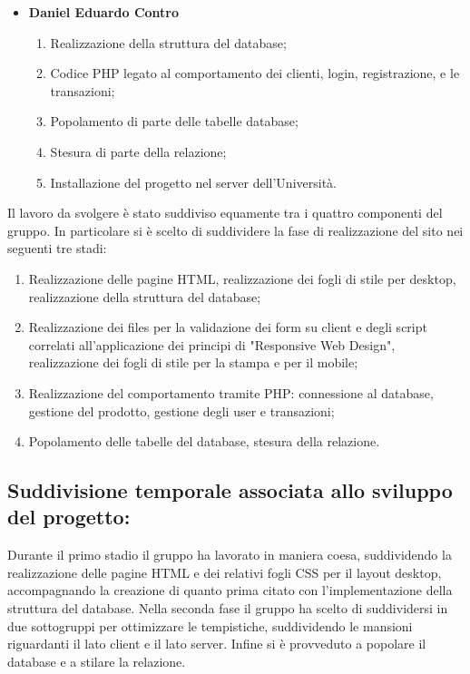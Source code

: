 \begin{itemize}
     \item \textbf{Daniel Eduardo Contro} \begin{enumerate}
        \item Realizzazione della struttura del database;
        \item Codice PHP legato al comportamento dei clienti, login, registrazione, e le transazioni;
        \item Popolamento di parte delle tabelle database;
        \item Stesura di parte della relazione;
        \item Installazione del progetto nel server dell'Università.
    \end{enumerate}
\end{itemize}

Il lavoro da svolgere è stato suddiviso equamente tra i quattro componenti del gruppo. In particolare si è scelto di suddividere la fase di realizzazione del sito nei seguenti tre stadi:
\begin{enumerate}
    \item Realizzazione delle pagine HTML, realizzazione dei fogli di stile per desktop, realizzazione della struttura del database;
    \item Realizzazione dei files per la validazione dei form su client e degli script correlati all'applicazione dei principi di "Responsive Web Design", realizzazione dei fogli di stile per la stampa e per il mobile;
    \item Realizzazione del comportamento tramite PHP: connessione al database, gestione del prodotto, gestione degli user e transazioni;
    \item Popolamento delle tabelle del database, stesura della relazione.
\end{enumerate}

\subsection{Suddivisione temporale associata allo sviluppo del progetto:}
Durante il primo stadio il gruppo ha lavorato in maniera coesa, suddividendo la realizzazione delle pagine HTML e dei relativi fogli CSS per il layout desktop, accompagnando la creazione di quanto prima citato con l'implementazione della struttura del database. Nella seconda fase il gruppo ha scelto di suddividersi in due sottogruppi per ottimizzare le tempistiche, suddividendo le mansioni riguardanti il lato client e il lato server. Infine si è provveduto a popolare il database e a stilare la relazione.